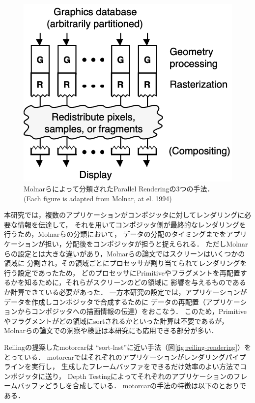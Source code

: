 \begin{figure}[htbp]
\begin{minipage}[t]{0.32\linewidth}
  \end{minipage}
  \begin{minipage}[t]{0.32\linewidth}
    \centering
    \includegraphics[keepaspectratio, width=\linewidth]{figures/sort-last.png}
  \end{minipage}
  \caption{
    Molnarらによって分類されたParallel Renderingの3つの手法．
    (Each figure is adapted from Molnar, at el. 1994\cite{parallel-rendering})
  }
  \label{fig:parallel-rendering}
\end{figure}

本研究では，複数のアプリケーションがコンポジッタに対してレンダリングに必要な情報を伝達して，
それを用いてコンポジッタ側が最終的なレンダリングを行うため，Molnarらの分類において，
データの分配のタイミングまでをアプリケーションが担い，分配後をコンポジッタが担うと捉えられる．
ただしMolnarらの設定とは大きな違いがあり，Molnarらの論文ではスクリーンはいくつかの領域に
分割され，その領域ごとにプロセッサが割り当てられてレンダリングを行う設定であったため，
どのプロセッサにPrimitiveやフラグメントを再配置するかを知るために，それらがスクリーンのどの領域に
影響を与えるものであるか計算できている必要があった．
一方本研究の設定では，アプリケーションがデータを作成しコンポジッタで合成するために
データの再配置（アプリケーションからコンポジッタへの描画情報の伝達）をおこなう．
このため，Primitiveやフラグメントがどの領域にsortされるかといった計算は不要であるが，
Molnarらの論文での洞察や検証は本研究にも応用できる部分が多い．

Reilingの提案したmotorcar\cite{reiling}は
``sort-last''に近い手法（図\ref{fig:reiling-rendering}）をとっている．
motorcarではそれぞれのアプリケーションがレンダリングパイプラインを実行し，
生成したフレームバッファをできるだけ効率のよい方法でコンポジッタに送り，
Depth Testingによってそれぞれのアプリケーションのフレームバッファどうしを合成している．
motorcarの手法の特徴は以下のとおりである．

